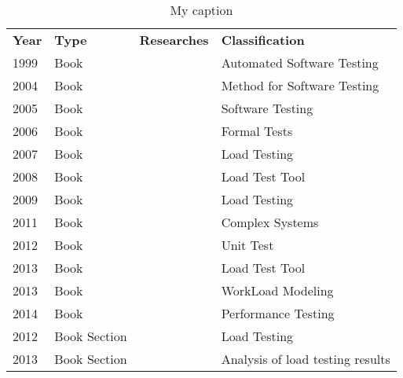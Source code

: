 \begin{longtable}{llll}
\caption{My caption}
\label{my-label} \\
\rowcolor[HTML]{C0C0C0} 
\textbf{Year} & \textbf{Type}    & \textbf{Researches}             & \textbf{Classification}          \\
1999          & Book             & \cite{Dustin1999}               & Automated Software Testing       \\
2004          & Book             & \cite{Perry2004}                & Method for Software Testing      \\
2005          & Book             & \cite{Lewis2005}                & Software Testing                 \\
2006          & Book             & \cite{Havelund2006}             & Formal Tests                     \\
2007          & Book             & \cite{Corporation2007}          & Load Testing                     \\
2008          & Book             & \cite{Halili2008}               & Load Test Tool                   \\
2009          & Book             & \cite{Molyneaux2009}            & Load Testing                     \\
2011          & Book             & \cite{Oliner2011}               & Complex Systems                  \\
2012          & Book             & \cite{Kaczanowski2012}          & Unit Test                        \\
2013          & Book             & \cite{Erinle2013}               & Load Test Tool                   \\
2013          & Book             & \cite{Feitelson2013}            & WorkLoad Modeling                \\
2014          & Book             & \cite{Geiger}                   & Performance Testing              \\
2012          & Book Section     & \cite{Avritzer2012a}            & Load Testing                     \\
2013          & Book Section     & \cite{Mayo2013}                 & Analysis of load testing results \\

\end{longtable}
